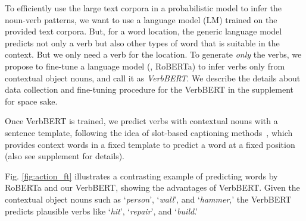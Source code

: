 To efficiently use the large text corpora in a probabilistic model to infer the noun-verb patterns, we want to use a language model (LM) trained on the provided text corpora. 
But, for a word location, the generic language model predicts not only a verb but also other types of word that is suitable in the context.
But we only need a verb for the location.
To generate \emph{only} the verbs, we propose to fine-tune a language model (\eg, RoBERTa) to infer verbs only from contextual object nouns, and call it as \emph{VerbBERT}.
We describe the details about data collection and fine-tuning procedure for the VerbBERT in the supplement for space sake.



Once VerbBERT is trained, we predict verbs with contextual nouns with a sentence template, following the idea of slot-based captioning methods~\cite{decoupled_captioner,videobert,neuralbabytalk,babytalk}, which provides context words in a fixed template to predict a word at a fixed position (also see supplement for details).

Fig. \ref{fig:action_ft} illustrates a contrasting example of predicting words by RoBERTa and our VerbBERT, showing the advantages of VerbBERT.
Given the contextual object nouns such as `\emph{person}', `\emph{wall}', and `\emph{hammer},' the VerbBERT predicts plausible verbs like `\emph{hit}', `\emph{repair}', and `\emph{build}.'








